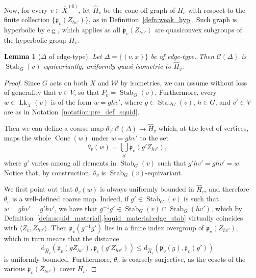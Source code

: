 \documentclass[svgnames]{amsart}
\theoremstyle{plain}
\newtheorem{lemma}[thm]{Lemma}
\theoremstyle{definition}
\newcommand{\C}{\mathcal C}
\newcommand{\ov}[1]{\overline{#1}}
\newcommand{\dist}{\mathrm{d}}
\newcommand{\link}{\operatorname{Lk}}
\newcommand{\Stab}[2]{\operatorname{Stab}_{#1}(#2)}
\newcommand{\W}{\mathcal{W}}
\newcommand{\p}{\mathfrak{p}}
\newcommand{\h}{\widehat}
\newcommand{\Squid}{\operatorname{Cone}}
\begin{document}
Now, for every $v\in \ov X^{(0)}$, let $\h H_v$ be the cone-off graph of $H_v$ with respect to the finite collection $\{\p_v(Z_{hv'})\}$, as in Definition~\ref{defn:weak_hyp}. Such graph is hyperbolic by e.g \cite[Theorem 7.11]{Bowditch_relhyp}, which applies as all $\p_v(Z_{hv'})$ are quasiconvex subgroups of the hyperbolic group $H_v$.
\begin{lemma}[$\Delta$ of edge-type]\label{lem:hyp_link_edge_type}
    Let $\Delta=\{(v,x)\}$ be of edge-type. Then $\C(\Delta)$ is $\Stab{G}{v}$-equivariantly, uniformly quasi-isometric to $\h H_v$.
\end{lemma}



\begin{proof}
Since $G$ acts on both $X$ and $\W$ by isometries, we can assume without loss of generality that $v\in V$, so that $P_v=\Stab{G}{v}$. Furthermore, every $w\in \link_{\ov X}(v)$ is of the form $w=ghv'$, where $g\in \Stab{G}{v}$, $h\in G$, and $v'\in V$ are as in Notation~\ref{notation:pre_def_squid}. 


Then we can define a coarse map $\theta_v\colon\C(\Delta)\to \h H_v$ which, at the level of vertices, maps the whole $\Squid(w)$ under $w=ghv'$ to the set 
$$\theta_v(w)=\bigcup_{g'} \p_v(g' Z_{hv'}),$$
where $g'$ varies among all elements in $\Stab{G}{v}$ such that $g'hv'=ghv'=w$. Notice that, by construction, $\theta_v$ is $\Stab{G}{v}$-equivariant.

We first point out that $\theta_v(w)$ is always uniformly bounded in $\h{H}_v$, and therefore $\theta_v$ is a well-defined coarse map. Indeed, if $g'\in \Stab{G}{v}$ is such that $w=ghv'=g'hv'$, we have that $g^{-1}g'\in\Stab{G}{v}\cap\Stab{G}{hv'}$, which by Definition~\ref{defn:squid_material}.\eqref{squid_material:edge_stab} virtually coincides with $\langle Z_v, Z_{hv'}\rangle$. Then $\p_v(g^{-1}g')$ lies in a finite index overgroup of $\p_v(Z_{hv'})$, which in turn means that the distance $$\dist_{\h H_v}(\p_v(g Z_{hv'}), \p_v(g' Z_{hv'}))\le \dist_{\h H_v}(\p_v(g), \p_v(g'))$$ is uniformly bounded. Furthermore, $\theta_v$ is coarsely surjective, as the cosets of the various $\p_v(Z_{hv'})$ cover $H_v$.


\end{proof}
\end{document}
